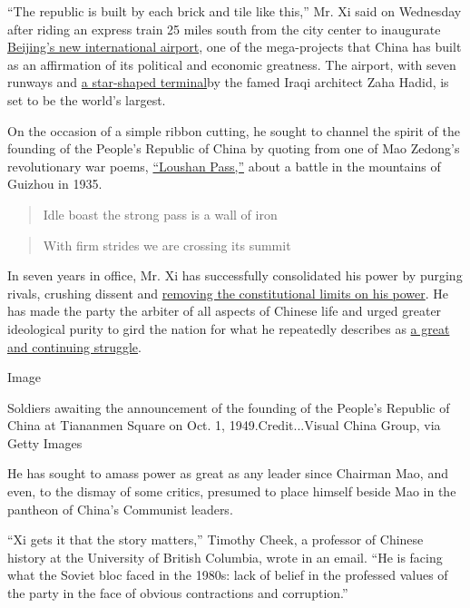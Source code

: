 ``The republic is built by each brick and tile like this,'' Mr. Xi said
on Wednesday after riding an express train 25 miles south from the city
center to inaugurate
\href{https://www.nytimes.com/2018/11/24/world/asia/china-beijing-daxing-airport.html}{Beijing's
new international airport}, one of the mega-projects that China has
built as an affirmation of its political and economic greatness. The
airport, with seven runways and
\href{https://www.bbc.co.uk/news/world-asia-china-49750182}{a
star-shaped terminal}by the famed Iraqi architect Zaha Hadid, is set to
be the world's largest.

On the occasion of a simple ribbon cutting, he sought to channel the
spirit of the founding of the People's Republic of China by quoting from
one of Mao Zedong's revolutionary war poems,
\href{https://allpoetry.com/Loushan-Pass}{``Loushan Pass,''} about a
battle in the mountains of Guizhou in 1935.

\begin{quote}
Idle boast the strong pass is a wall of iron
\end{quote}

\begin{quote}
With firm strides we are crossing its summit
\end{quote}

In seven years in office, Mr. Xi has successfully consolidated his power
by purging rivals, crushing dissent and
\href{https://www.nytimes.com/2018/03/11/world/asia/china-xi-constitution-term-limits.html?searchResultPosition=1}{removing
the constitutional limits on his power}. He has made the party the
arbiter of all aspects of Chinese life and urged greater ideological
purity to gird the nation for what he repeatedly describes as
\href{https://www.nytimes.com/2019/09/07/world/asia/china-hong-kong-xi-jinping.html}{a
great and continuing struggle}.

Image

Soldiers awaiting the announcement of the founding of the People's
Republic of China at Tiananmen Square on Oct. 1, 1949.Credit...Visual
China Group, via Getty Images

He has sought to amass power as great as any leader since Chairman Mao,
and even, to the dismay of some critics, presumed to place himself
beside Mao in the pantheon of China's Communist leaders.

``Xi gets it that the story matters,'' Timothy Cheek, a professor of
Chinese history at the University of British Columbia, wrote in an
email. ``He is facing what the Soviet bloc faced in the 1980s: lack of
belief in the professed values of the party in the face of obvious
contractions and corruption.''

